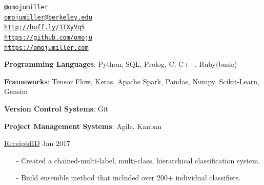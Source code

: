 \documentclass[11pt,article,oneside]{memoir}
\makeatletter
\def\myemail{omojumiller@berkeley.edu}
\def\myweb{https://omojumiller.com}
\def\mytwitter{@omojumiller}
\def\mylinkedin{http://buff.ly/1TXyVq5}
\def\mygithub{https://github.com/omoju}
\makeatother
\begin{document}
\begin{minipage}[t]{2.95in}

\end{minipage}
\hfill
\hfill
\begin{minipage}[t]{2in}
  \flushright \footnotesize  \addressblock
  {\scriptsize  \texttt{\href{http://twitter.com/omojumiller}{\mytwitter}} \, \faTwitter }  \\
  {\scriptsize  \texttt{\href{mailto:\myemail}{\myemail}} \, \faEnvelope} \\
  {\scriptsize  \texttt{\href{\mylinkedin}{\mylinkedin}} \, \faLinkedin} \\
  {\scriptsize  \texttt{\href{\mygithub}{\mygithub}} \, \faGithub} \\
  {\scriptsize  \texttt{\href{\myweb}{\myweb}} \, \faGlobe}
\end{minipage}

\medskip


\bigskip       
{}
\reversemarginpar

\medskip

\ind \textbf{Programming Languages}: Python, SQL, Prolog, C, C++, Ruby(basic)

\ind \textbf{Frameworks}: Tensor Flow, Keras, Apache Spark, Pandas, Numpy, Scikit-Learn, Gensim

\ind \textbf{Version Control Systems}: Git

\ind \textbf{Project Management Systems}: Agile, Kanban

\bigskip 



\medskip

\ind \href{https://github.com/omoju/receiptdID}{ReceiptdID} \hfill Jan 2017
\begin{itemize}[noitemsep,nolistsep]
\item[-] Created a chained-multi-label, multi-class, hierarchical classification system.
\item[-] Build ensemble method that included over 200+ individual classifiers.
\end{itemize}
\end{document}
